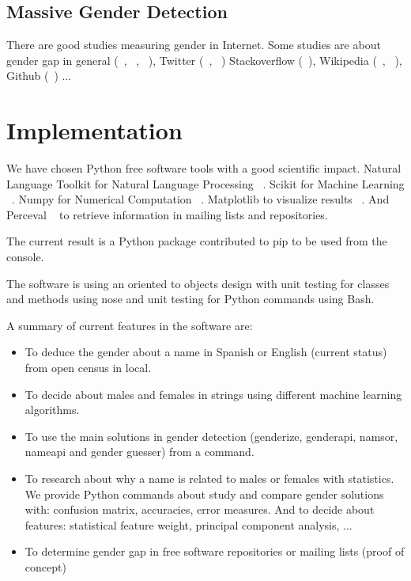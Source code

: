 \documentclass[a4paper]{article}
\begin{document}
\subsection*{Massive Gender Detection}

There are good studies measuring gender in Internet. Some studies are
about gender gap in general (~\cite{robles2014floss},
~\cite{holman2018gender}, ~\cite{dollar1999gender}), Twitter
(~\cite{burger2011discriminating}, ~\cite{mislove2011understanding})
Stackoverflow (~\cite{vasilescu2012gender}), Wikipedia
(~\cite{antin2011gender}, ~\cite{hill2013wikipedia}), Github
(~\cite{vasilescu2015gender}) ...

\section*{Implementation}

We have chosen Python free software tools with a good scientific
impact. Natural Language Toolkit for Natural Language Processing
~\cite{loper2002nltk}. Scikit for Machine Learning
~\cite{pedregosa2011scikit}. Numpy for Numerical Computation
~\cite{van2011numpy}. Matplotlib to visualize results
~\cite{hunter2007matplotlib}. And Perceval ~\cite{duenas2018perceval}
to retrieve information in mailing lists and repositories.

The current result is a Python package contributed to pip to be used
from the console.

The software is using an oriented to objects design with unit testing
for classes and methods using nose and unit testing for Python
commands using Bash. 

A summary of current features in the software are:

\begin{itemize}[noitemsep]
\item To deduce the gender about a name in Spanish or English (current
  status) from open census in local.
\item To decide about males and females in strings using different
  machine learning algorithms.
\item To use the main solutions in gender detection (genderize, genderapi,
namsor, nameapi and gender guesser) from a command.
\item To research about why a name is related to males or females with
  statistics. We provide Python commands about study and compare
  gender solutions with: confusion matrix, accuracies, error
  measures. And to decide about features: statistical feature weight,
  principal component analysis, ...
\item To determine gender gap in free software repositories or mailing
  lists (proof of concept)
\end{itemize}
\end{document}
